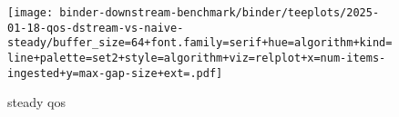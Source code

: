 \begin{figure}
\texttt{[image: binder-downstream-benchmark/binder/teeplots/2025-01-18-qos-dstream-vs-naive-steady/buffer\_size=64+font.family=serif+hue=algorithm+kind=line+palette=set2+style=algorithm+viz=relplot+x=num-items-ingested+y=max-gap-size+ext=.pdf]}
\caption{steady qos}
\label{fig:steady-qos}
\end{figure}
